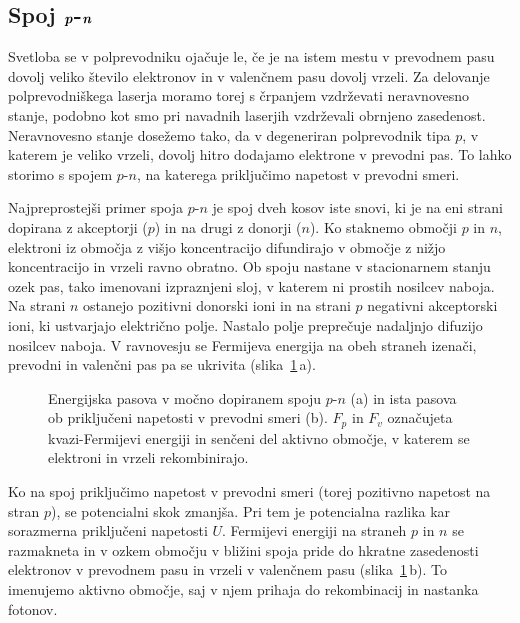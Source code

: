 \subsection*{Spoj $\textbf{\textit{p}}$-$\textbf{\textit{n}}$}
Svetloba se v polprevodniku ojačuje le, če je na istem mestu v prevodnem pasu
dovolj veliko število elektronov in v valenčnem pasu dovolj vrzeli. Za delovanje
polprevodniškega laserja moramo torej s črpanjem vzdrževati neravnovesno stanje, 
podobno kot smo pri navadnih laserjih vzdrževali obrnjeno zasedenost. 
Neravnovesno stanje dosežemo tako, da v degeneriran pol\-pre\-vod\-nik tipa $p$, v
katerem je veliko vrzeli, dovolj hitro dodajamo elektrone v prevodni pas. To lahko storimo s spojem
$p$-$n$, na katerega priključimo napetost v prevodni smeri. 

Najpreprostejši primer spoja $p$-$n$ je spoj dveh kosov iste snovi, ki je
na eni strani dopirana z akceptorji ($p$) in na drugi z donorji ($n$). 
Ko staknemo območji $p$ in $n$, elektroni iz območja z višjo koncentracijo 
difundirajo v območje z nižjo koncentracijo in vrzeli ravno obratno. 
Ob spoju nastane v stacionarnem stanju ozek pas, tako imenovani izpraznjeni sloj, 
v katerem ni prostih nosilcev naboja. Na strani $n$ ostanejo pozitivni donorski ioni in 
na strani $p$ negativni akceptorski ioni, ki ustvarjajo električno polje. 
Nastalo polje preprečuje nadaljnjo difuzijo nosilcev naboja. 
V ravnovesju se Fermijeva energija na obeh straneh izenači, 
prevodni in valenčni pas pa se ukrivita (slika~\ref{fig:pnlaser}\,a).
\begin{figure}[ht]
\centering
\def\svgwidth{128truemm} 

\caption{Energijska pasova v močno dopiranem spoju $p$-$n$ (a) in 
ista pasova ob priključeni napetosti v prevodni smeri (b). $F_p$ in $F_v$
označujeta kvazi-Fermijevi energiji in senčeni del aktivno območje, 
v katerem se elektroni in vrzeli rekombinirajo.
}
\label{fig:pnlaser}
\end{figure}

Ko na spoj priključimo napetost v prevodni smeri (torej pozitivno napetost na stran
$p$), se potencialni skok zmanjša. Pri tem je potencialna razlika kar sorazmerna priključeni
napetosti $U$. Fermijevi energiji na straneh $p$ in $n$ se razmakneta in v
ozkem območju v bližini spoja pride do hkratne zasedenosti elektronov
v prevodnem pasu in vrzeli v valenčnem pasu (slika~\ref{fig:pnlaser}\,b). 
To imenujemo aktivno območje, saj v njem prihaja do rekombinacij in
nastanka fotonov. 

